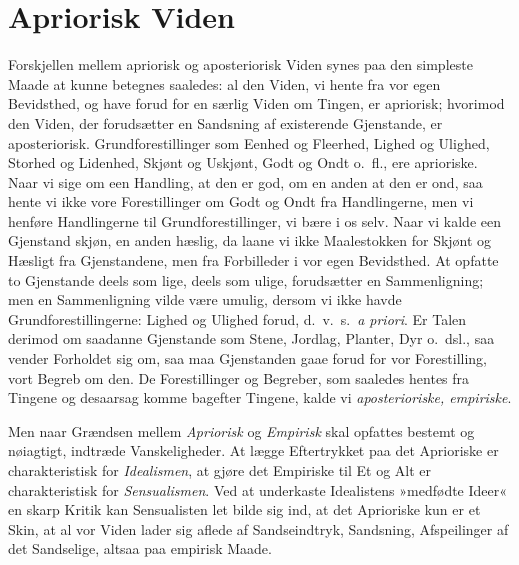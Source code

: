 \documentclass[12pt]{book}
\newcommand{\apage}[1]{\marginnote{\footnotesize\textit{[#1]}}}
\begin{document}
\section{Apriorisk Viden}
\label{sec:4}

\noindent Forskjellen mellem apriorisk og aposteriorisk Viden synes paa
den simpleste Maade at kunne betegnes saaledes: al den Viden, vi hente fra
vor egen Bevidsthed, og have forud for en særlig Viden om Tingen, er
apriorisk; hvorimod den Viden, der forudsætter en \apage{30} Sandsning af existerende
Gjenstande, er aposteriorisk. Grundforestillinger som Eenhed og Fleerhed,
Lighed og Ulighed, Storhed og Lidenhed, Skjønt og Uskjønt, Godt og Ondt
o.\ fl., ere aprioriske. Naar vi sige om een Handling, at den er god, om
en anden at den er ond, saa hente vi ikke vore Forestillinger om Godt og
Ondt fra Handlingerne, men vi henføre Handlingerne til Grundforestillinger,
vi bære i os selv. Naar vi kalde een Gjenstand skjøn, en anden hæslig, da
laane vi ikke Maalestokken for Skjønt og Hæsligt fra Gjenstandene, men fra
Forbilleder i vor egen Bevidsthed. At opfatte to Gjenstande deels som
lige, deels som ulige, forudsætter en Sammenligning; men en Sammenligning
vilde være umulig, dersom vi ikke havde Grundforestillingerne: Lighed og
Ulighed forud, d.\ v.\ s.\ \emph{a priori}. Er Talen derimod om saadanne Gjenstande
som Stene, Jordlag, Planter, Dyr o.\ dsl., saa vender Forholdet sig om,
saa maa Gjenstanden gaae forud for vor Forestilling, vort Begreb om den.
De Forestillinger og Begreber, som saaledes hentes fra Tingene og
desaarsag komme bagefter Tingene, kalde vi \emph{aposterioriske, empiriske}.

Men naar Grændsen mellem \emph{Apriorisk} og \emph{Empirisk} skal opfattes bestemt og
nøiagtigt, indtræde Vanskeligheder. At lægge Eftertrykket paa det
Aprioriske er charakteristisk for \emph{Idealismen}, at gjøre det Empiriske til
Et og Alt er charakteristisk for \emph{Sensualismen}. Ved at underkaste
Idealistens »medfødte Ideer« en skarp Kritik kan Sensualisten let bilde
sig ind, at det Aprioriske kun er et Skin, at al vor Viden  \apage{31} lader sig
aflede af Sandseindtryk, Sandsning, Afspeilinger af det Sandselige,
altsaa paa empirisk Maade.
\end{document}
